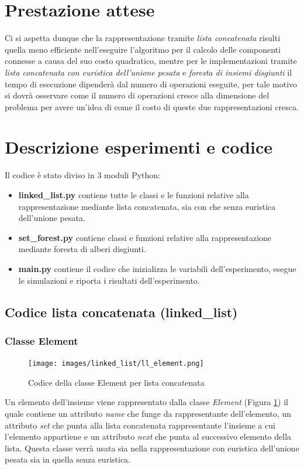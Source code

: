\documentclass[12pt]{article}
\begin{document}
\section{Prestazione attese}
Ci si aspetta dunque che la rappresentazione tramite \textit{lista concatenata} risulti quella meno efficiente nell'eseguire l'algoritmo per il calcolo delle componenti connesse a causa del suo costo quadratico, mentre per le implementazioni tramite \textit{lista concatenata con euristica dell'unione pesata} e \textit{foresta di insiemi disgiunti} il tempo di esecuzione dipenderà dal numero di operazioni eseguite, per tale motivo si dovrà osservare come il numero di operazioni cresce alla dimensione del problema per avere un'idea di come il costo di queste due rappresentazioni cresca.

\section{Descrizione esperimenti e codice}

Il codice è stato diviso in 3 moduli Python:
\begin{itemize}
    \item \textbf{linked\_list.py} contiene tutte le classi e le funzioni relative alla rappresentazione mediante lista concatenata, sia con che senza euristica dell'unione pesata.
    \item \textbf{set\_forest.py} contiene classi e funzioni relative alla rappresentazione mediante foresta di alberi disgiunti.
    \item \textbf{main.py} contiene il codice che inizializza le variabili dell'esperimento, esegue le simulazioni e riporta i risultati dell'esperimento.
\end{itemize}

\subsection{Codice lista concatenata (linked\_list)}
\subsubsection{Classe Element}
\begin{figure}[h]
    \centering
    \texttt{[image: images/linked\_list/ll\_element.png]}
    \caption{Codice della classe Element per lista concatenata}
    \label{fig:ll_element}
\end{figure}
Un elemento dell'insieme viene rappresentato dalla classe \textit{Element} (Figura \ref{fig:ll_element}) il quale contiene un attributo \textit{name} che funge da rappresentante dell'elemento, un attributo \textit{set} che punta alla lista concatenata rappresentante l'insieme a cui l'elemento appartiene e un attributo \textit{next} che punta al successivo elemento della lista.
Questa classe verrà usata sia nella rappresentazione con euristica dell'unione pesata sia in quella senza euristica.
\end{document}
